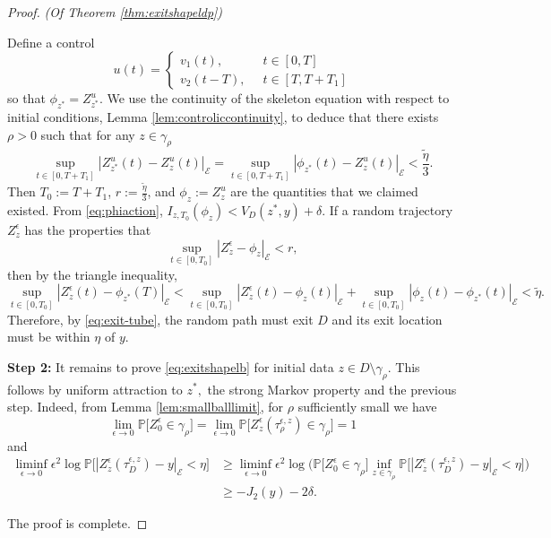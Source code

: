 \documentclass[10pt, reqno]{amsart}
\newcommand{\pr}{\mathbb{P}}
\newcommand{\e}{\mathcal{E}}
\theoremstyle{definition}
\numberwithin{lem}{section}
\numberwithin{cor}{section}
\numberwithin{prop}{section}
\numberwithin{thm}{section}
\numberwithin{dfn}{section}
\begin{document}
\begin{proof}{\textit{(Of Theorem \ref{thm:exitshapeldp})}}
\begin{enumerate}
Define a control
\begin{equation}\label{eq:udef}
    u(t)=\begin{cases}
           v_1(t),&\;\;t\in[0,T]\\
           v_2(t-T),&\;\;t\in[T,T+T_1]
    \end{cases}
\end{equation}
so that $\phi_{z^*}=Z_{z^*}^u.$ We use the continuity of the skeleton equation with respect to initial conditions, Lemma \ref{lem:controliccontinuity}, to deduce that there exists $\rho>0$ such that for any $z\in\gamma_{\rho}$ 
\begin{equation}\label{eq:phiZvdistance}
      \sup_{t\in[0,T+T_1]}|Z^u_{z^*}(t)-Z^u_{z}(t)|_{\e}= \sup_{t\in[0,T+T_1]}|\phi_{z^*}(t)-Z^u_{z}(t)|_{\e}<\frac{\tilde\eta}{3}.
\end{equation}
Then $T_0 := T + T_1$, $r := \frac{\tilde \eta}{3}$, and $\phi_z:= Z^u_z$ are the quantities that we claimed existed.
From \eqref{eq:phiaction}, $I_{z,T_0}(\phi_z)< V_D(z^*, y) + \delta$.
If a random trajectory $Z^\epsilon_z$ has the properties that 
\begin{equation}
    \sup_{t \in [0,T_0]} | Z^\epsilon_z - \phi_z|_\e<r,
\end{equation}
then by the triangle inequality,
\begin{equation}
   \sup_{t \in [0,T_0]} |Z^\epsilon_z(t) - \phi_{z^*}(T)|_\e < \sup_{t \in [0,T_0]} |Z^\epsilon_z(t) - \phi_{z}(t)|_\e + \sup_{t \in [0,T_0]} |\phi_z(t) - \phi_{z^*}(t)|_\e < \tilde{\eta}.
\end{equation}
Therefore, by \eqref{eq:exit-tube}, the random path must exit $D$ and its exit location must be within $\eta$ of $y$.

\noindent \textbf{Step 2:} It remains to prove \eqref{eq:exitshapelb} for initial data $z\in D\setminus\gamma_\rho.$ This follows by uniform attraction to $z^*,$  the strong Markov property and the previous step. Indeed, from Lemma \ref{lem:smallballlimit}, for $\rho$ sufficiently small we have 
$$\lim_{\epsilon\to 0}\pr\bigg[Z^\epsilon_0\in \gamma_\rho   \bigg]= \lim_{\epsilon\to 0}\pr\bigg[Z^\epsilon_z(\tau^{\epsilon, z}_{\rho})\in \gamma_\rho   \bigg]=1$$
    and 
    \begin{equation*}
    \begin{aligned}
         \liminf_{\epsilon\to 0}\epsilon^2\log\pr\bigg[ |Z^\epsilon_z(\tau^{\epsilon, z}_{D})-y|_{\e}<\eta \bigg]
        &\geq \liminf_{\epsilon\to 0}\epsilon^2\log\bigg(\pr\bigg[Z^\epsilon_0\in \gamma_\rho   \bigg]\inf_{z\in\gamma_\rho}\pr\bigg[ |Z^\epsilon_z(\tau^{\epsilon, z}_{D})-y|_{\e}<\eta \bigg] \bigg)\\&
        \geq -J_2(y)-2\delta.
    \end{aligned}  
    \end{equation*}
    \end{enumerate} 
    The proof is complete.  
\end{proof}
\end{document}
